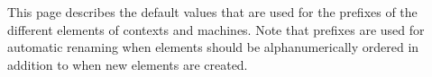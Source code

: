 This page describes the default values that are used for the prefixes of the different elements of contexts and machines. Note that prefixes are used for automatic renaming when elements should be alphanumerically ordered in addition to when new elements are created. 






